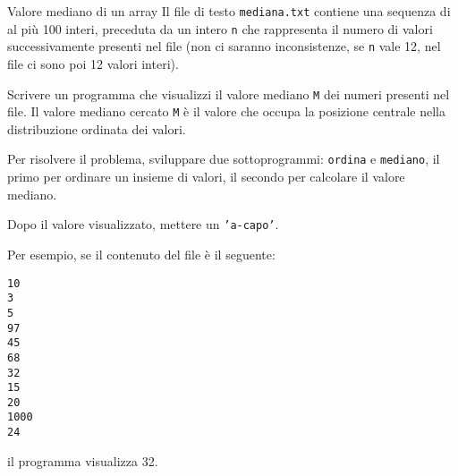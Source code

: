 \begin{labex}{Valore mediano di un array}
Il file di testo \texttt{mediana.txt} contiene una sequenza di al pi\`u 100 interi, preceduta da un intero \texttt{n} che rappresenta il numero di valori successivamente presenti nel file (non ci saranno inconsistenze, se \texttt{n} vale 12, nel file ci sono poi 12 valori interi).

Scrivere un programma che visualizzi il valore mediano \texttt{M} dei numeri presenti nel file. Il valore mediano cercato \texttt{M} \`e il valore che occupa la posizione centrale nella distribuzione ordinata dei valori.

Per risolvere il problema, sviluppare due sottoprogrammi: \texttt{ordina} e \texttt{mediano}, il primo per ordinare un insieme di valori, il secondo per calcolare il valore mediano.

Dopo il valore visualizzato, mettere un \texttt{'a-capo'}.

Per esempio, se il contenuto del file \`e il seguente:

\begin{verbatim}
10
3
5
97
45
68
32
15
20
1000
24
\end{verbatim}

il programma visualizza 32.

\begin{labexinout}
\end{labexinout}


\end{labex}

